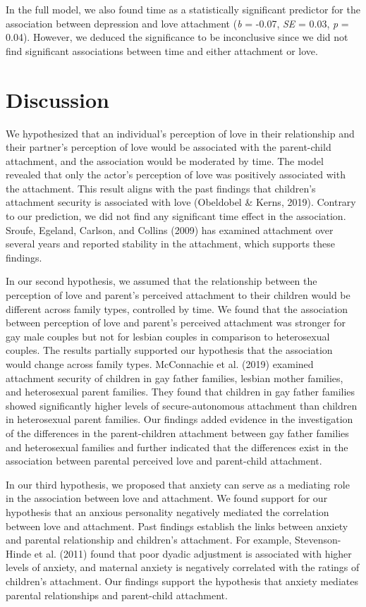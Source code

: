 \documentclass[man]{apa6}
\begin{document}
In the full model, we also found time as a statistically significant predictor for the association between depression and love attachment (\emph{b} = -0.07, \emph{SE} = 0.03, \emph{p} = 0.04). However, we deduced the significance to be inconclusive since we did not find significant associations between time and either attachment or love.

\hypertarget{discussion}{%
\section{Discussion}\label{discussion}}

We hypothesized that an individual's perception of love in their relationship and their partner's perception of love would be associated with the parent-child attachment, and the association would be moderated by time. The model revealed that only the actor's perception of love was positively associated with the attachment. This result aligns with the past findings that children's attachment security is associated with love (Obeldobel \& Kerns, 2019). Contrary to our prediction, we did not find any significant time effect in the association. Sroufe, Egeland, Carlson, and Collins (2009) has examined attachment over several years and reported stability in the attachment, which supports these findings.

In our second hypothesis, we assumed that the relationship between the perception of love and parent's perceived attachment to their children would be different across family types, controlled by time. We found that the association between perception of love and parent's perceived attachment was stronger for gay male couples but not for lesbian couples in comparison to heterosexual couples. The results partially supported our hypothesis that the association would change across family types. McConnachie et al. (2019) examined attachment security of children in gay father families, lesbian mother families, and heterosexual parent families. They found that children in gay father families showed significantly higher levels of secure-autonomous attachment than children in heterosexual parent families. Our findings added evidence in the investigation of the differences in the parent-children attachment between gay father families and heterosexual families and further indicated that the differences exist in the association between parental perceived love and parent-child attachment.

In our third hypothesis, we proposed that anxiety can serve as a mediating role in the association between love and attachment. We found support for our hypothesis that an anxious personality negatively mediated the correlation between love and attachment. Past findings establish the links between anxiety and parental relationship and children's attachment. For example, Stevenson-Hinde et al. (2011) found that poor dyadic adjustment is associated with higher levels of anxiety, and maternal anxiety is negatively correlated with the ratings of children's attachment. Our findings support the hypothesis that anxiety mediates parental relationships and parent-child attachment.
\end{document}
